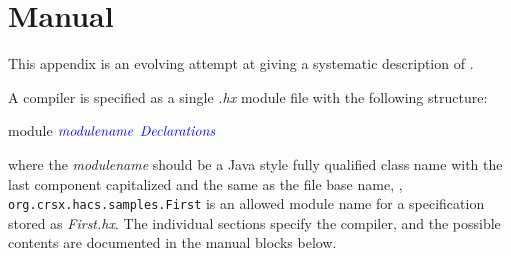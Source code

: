 \documentclass[11pt]{article} %
\begin{document}
\clearpage
\appendix\small

\section{Manual}\label{app:manual}

This appendix is an evolving attempt at giving a systematic description of \HAX.

\begin{manual}\label{man:structure}
  A \HAX compiler is specified as a single \emph{.hx} module file with the following structure:
  \begin{hacs}[mathescape,xleftmargin=\parindent]
module $\text{\it\color{blue}modulename}$
{
  $\text{\it\color{blue}Declarations}$
}
  \end{hacs}
  where the \emph{modulename} should be a Java style fully qualified class name with the last
  component capitalized and the same as the file base name, \eg, \verb|org.crsx.hacs.samples.First|
  is an allowed module name for a specification stored as \emph{First.hx}. The individual sections
  specify the compiler, and the possible contents are documented in the manual blocks below.
\end{manual}
\end{document}
